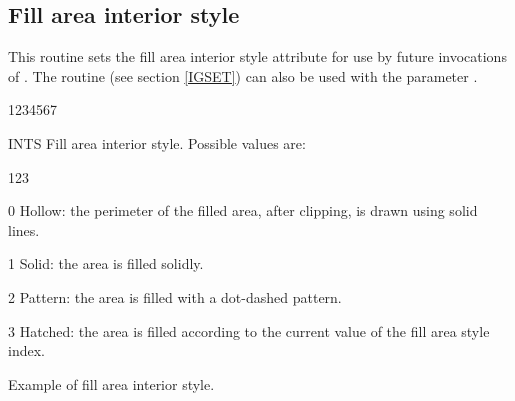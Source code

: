 \subsection{Fill area interior style}
\Action
This routine sets the fill area interior style attribute for use by future
invocations of . The routine  (see section \ref{IGSET})
can also be used with the parameter .
\Pdesc
\begin{DLtt}{1234567}
\item[INTS] Fill area interior style. Possible values are:
\begin{DLtt}{123}
\item[0] Hollow: the perimeter of the filled area, after clipping, is drawn
         using solid lines.
\item[1] Solid: the area is filled solidly.
\item[2] Pattern: the area is filled with a dot-dashed pattern.
\item[3] Hatched: the area is filled according to the current
value of the fill area style index.
\end{DLtt}
\end{DLtt}
\begin{Fighere}
\begin{center}\mbox{}\end{center}
\caption{Example of fill area interior style.}
\label{FILL-IS}
\end{Fighere}
%
\newpage
